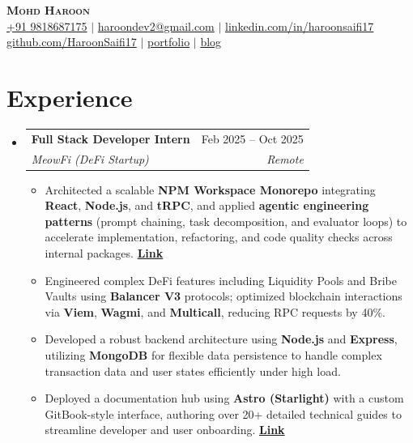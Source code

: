 \documentclass[letterpaper,11pt]{article}
\makeatletter
\newcommand{\resumeItem}[1]{
  \item\small{
    {#1 \vspace{-2pt}}
  }
}
\newcommand{\resumeSubheading}[4]{
  \vspace{-2pt}\item
    \begin{tabular*}{0.97\textwidth}[t]{l@{\extracolsep{\fill}}r}
      \textbf{#1} & #2 \\
      \textit{\small#3} & \textit{\small #4} \\
    \end{tabular*}\vspace{-7pt}
}
\newcommand{\resumeSubHeadingListStart}{\begin{itemize}[leftmargin=0.15in, label={}]}
\newcommand{\resumeSubHeadingListEnd}{\end{itemize}}
\newcommand{\resumeItemListStart}{\begin{itemize}}
\newcommand{\resumeItemListEnd}{\end{itemize}\vspace{-5pt}}
\makeatother
\begin{document}
\begin{center}
    \textbf{\Huge \scshape Mohd Haroon} \\ \vspace{3pt}
    \small \href{tel:+919818687175}{+91 9818687175} $|$
    \href{mailto:haroondev2@gmail.com}{haroondev2@gmail.com} $|$
    \href{https://linkedin.com/in/haroonsaifi17}{linkedin.com/in/haroonsaifi17} \\ \vspace{2pt}
    \href{https://github.com/HaroonSaifi17}{github.com/HaroonSaifi17} $|$
    \href{https://portfolio-v4-roan.vercel.app/}{portfolio} $|$
    \href{https://portfolio-v4-roan.vercel.app/blog}{blog}
\end{center}

\vspace{-1.5em}

\section{Experience}
  \resumeSubHeadingListStart

    \resumeSubheading
      {Full Stack Developer Intern}{Feb 2025 -- Oct 2025}
      {MeowFi (DeFi Startup)}{Remote}
    \resumeItemListStart
        \resumeItem{Architected a scalable \textbf{NPM Workspace Monorepo} integrating \textbf{React}, \textbf{Node.js}, and \textbf{tRPC}, and applied \textbf{agentic engineering patterns} (prompt chaining, task decomposition, and evaluator loops) to accelerate implementation, refactoring, and code quality checks across internal packages. \hfill \href{https://portfolio-v4-roan.vercel.app/case-studies/meowfi-dapp}{\textbf{Link}}}
        \resumeItem{Engineered complex DeFi features including Liquidity Pools and Bribe Vaults using \textbf{Balancer V3} protocols; optimized blockchain interactions via \textbf{Viem}, \textbf{Wagmi}, and \textbf{Multicall}, reducing RPC requests by 40\%.}
        \resumeItem{Developed a robust backend architecture using \textbf{Node.js} and \textbf{Express}, utilizing \textbf{MongoDB} for flexible data persistence to handle complex transaction data and user states efficiently under high load.}
        \resumeItem{Deployed a documentation hub using \textbf{Astro (Starlight)} with a custom GitBook-style interface, authoring over 20+ detailed technical guides to streamline developer and user onboarding. \hfill \href{https://docs.meowfi.xyz}{\textbf{Link}}}
    \resumeItemListEnd

  \resumeSubHeadingListEnd
\end{document}
